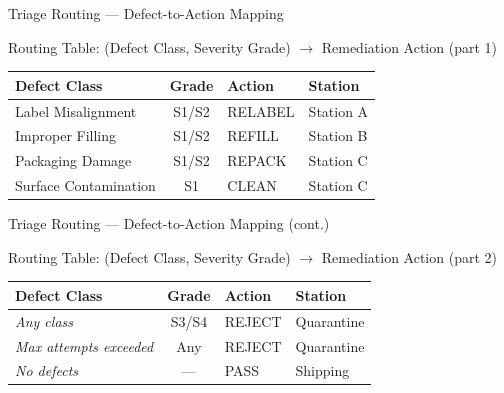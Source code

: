 \documentclass[10pt]{beamer}
\begin{document}
\begin{frame}[t]{Triage Routing --- Defect-to-Action Mapping}

\tiny
\begin{block}{Routing Table: (Defect Class, Severity Grade) $\to$ Remediation Action (part 1)}
\begin{center}
\begin{tabular}{|l|c|l|l|}
\hline
\textbf{Defect Class} & \textbf{Grade} & \textbf{Action} & \textbf{Station} \\
\hline
Label Misalignment & S1/S2 & RELABEL & Station A \\
Improper Filling & S1/S2 & REFILL & Station B \\
Packaging Damage & S1/S2 & REPACK & Station C \\
Surface Contamination & S1 & CLEAN & Station C \\
\hline
\end{tabular}
\end{center}
\end{block}

\end{frame}

\begin{frame}[t]{Triage Routing --- Defect-to-Action Mapping (cont.)}

\tiny
\begin{block}{Routing Table: (Defect Class, Severity Grade) $\to$ Remediation Action (part 2)}
\begin{center}
\begin{tabular}{|l|c|l|l|}
\hline
\textbf{Defect Class} & \textbf{Grade} & \textbf{Action} & \textbf{Station} \\
\hline
\textit{Any class} & S3/S4 & REJECT & Quarantine \\
\textit{Max attempts exceeded} & Any & REJECT & Quarantine \\
\textit{No defects} & --- & PASS & Shipping \\
\hline
\end{tabular}
\end{center}
\end{block}

\end{frame}
\end{document}
